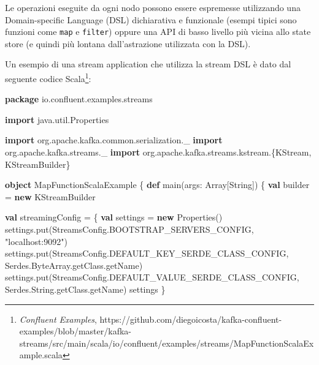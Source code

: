 \documentclass[]{article}
\newenvironment{Shaded}{}{}
\newcommand{\KeywordTok}[1]{\textcolor[rgb]{0.00,0.44,0.13}{\textbf{#1}}}
\newcommand{\StringTok}[1]{\textcolor[rgb]{0.25,0.44,0.63}{#1}}
\newcommand{\FunctionTok}[1]{\textcolor[rgb]{0.02,0.16,0.49}{#1}}
\newcommand{\NormalTok}[1]{#1}
\begin{document}
\newpage

Le operazioni eseguite da ogni nodo possono essere espremesse
utilizzando una Domain-specific Language (DSL) dichiarativa e funzionale
(esempi tipici sono funzioni come \texttt{map} e \texttt{filter}) oppure
una API di basso livello più vicina allo state store (e quindi più
lontana dall'astrazione utilizzata con la DSL).

Un esempio di una stream application che utilizza la stream DSL è dato
dal seguente codice Scala\footnote{\emph{Confluent Examples},
  https://github.com/diegoicosta/kafka-confluent-examples/blob/master/kafka-streams/src/main/scala/io/confluent/examples/streams/MapFunctionScalaExample.scala}:

\small

\begin{Shaded}
\begin{Highlighting}[]
\KeywordTok{package}\NormalTok{ io.}\FunctionTok{confluent}\NormalTok{.}\FunctionTok{examples}\NormalTok{.}\FunctionTok{streams}

\KeywordTok{import}\NormalTok{ java.}\FunctionTok{util}\NormalTok{.}\FunctionTok{Properties}

\KeywordTok{import}\NormalTok{ org.}\FunctionTok{apache}\NormalTok{.}\FunctionTok{kafka}\NormalTok{.}\FunctionTok{common}\NormalTok{.}\FunctionTok{serialization}\NormalTok{._}
\KeywordTok{import}\NormalTok{ org.}\FunctionTok{apache}\NormalTok{.}\FunctionTok{kafka}\NormalTok{.}\FunctionTok{streams}\NormalTok{._}
\KeywordTok{import}\NormalTok{ org.}\FunctionTok{apache}\NormalTok{.}\FunctionTok{kafka}\NormalTok{.}\FunctionTok{streams}\NormalTok{.}\FunctionTok{kstream}\NormalTok{.\{KStream, KStreamBuilder\}}

\KeywordTok{object}\NormalTok{ MapFunctionScalaExample \{}
  \KeywordTok{def} \FunctionTok{main}\NormalTok{(args: Array[String]) \{}
    \KeywordTok{val}\NormalTok{ builder = }\KeywordTok{new}\NormalTok{ KStreamBuilder}

    \KeywordTok{val}\NormalTok{ streamingConfig = \{}
      \KeywordTok{val}\NormalTok{ settings = }\KeywordTok{new}\NormalTok{ Properties()}
\NormalTok{      settings.}\FunctionTok{put}\NormalTok{(StreamsConfig.}\FunctionTok{BOOTSTRAP_SERVERS_CONFIG}\NormalTok{, }\StringTok{"localhost:9092"}\NormalTok{)}
\NormalTok{      settings.}\FunctionTok{put}\NormalTok{(StreamsConfig.}\FunctionTok{DEFAULT_KEY_SERDE_CLASS_CONFIG}\NormalTok{,}
\NormalTok{                    Serdes.}\FunctionTok{ByteArray}\NormalTok{.}\FunctionTok{getClass}\NormalTok{.}\FunctionTok{getName}\NormalTok{)}
\NormalTok{      settings.}\FunctionTok{put}\NormalTok{(StreamsConfig.}\FunctionTok{DEFAULT_VALUE_SERDE_CLASS_CONFIG}\NormalTok{,}
\NormalTok{                    Serdes.}\FunctionTok{String}\NormalTok{.}\FunctionTok{getClass}\NormalTok{.}\FunctionTok{getName}\NormalTok{)}
\NormalTok{      settings}
\NormalTok{    \}}


\end{Highlighting}
\end{Shaded}
\end{document}
